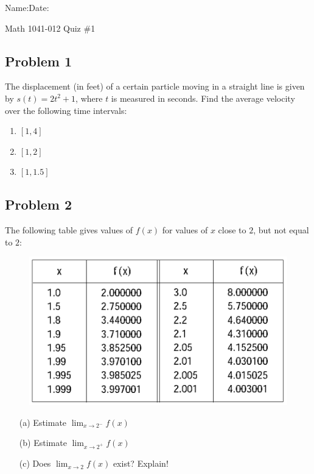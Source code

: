 \documentclass[10pt]{book}
\theoremstyle{definition}
\begin{document}
\begin{flushleft}
Name:\underline{\hspace{13cm}}Date:\underline{\hspace{2cm}}
\end{flushleft}
\begin{center}
{\Large Math 1041-012 \hspace{0.5cm} Quiz \#1}
\end{center}
\vspace{0.2 cm}
\subsection*{Problem 1}The displacement (in feet) of a certain particle moving in a straight line is given by $s(t)=2t^2+1$, where $t$ is measured in seconds. Find the average velocity over the following time intervals:
\begin{enumerate}[label=(\alph*)]
    \item $[1,4]$\\ \vspace{1.5cm}
    \item $[1,2]$\\ \vspace{1.5cm}
    \item $[1,1.5]$\\ \vspace{1.5cm}
\end{enumerate}
\subsection*{Problem 2} The following table gives values of $f(x)$ for values of $x$ close to $2$, but not equal to $2$:
\begin{figure}[h!]
    \centering
    \includegraphics[scale=0.45]{fig1.png}
\end{figure}
\begin{itemize}
    \item[(a)] Estimate $\displaystyle\lim_{x\rightarrow 2^-}f(x)$
    \item[(b)] Estimate $\displaystyle\lim_{x\rightarrow 2^+}f(x)$
    \item[(c)] Does $\displaystyle\lim_{x\rightarrow 2}f(x)$ exist? Explain!
\end{itemize}
\raggedbottom
\clearpage
\end{document}
